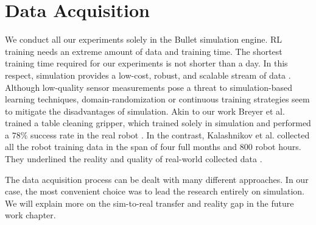 \section{Data Acquisition}

We conduct all our experiments solely in the Bullet simulation engine. RL training needs an extreme amount of data and training time. The shortest training time required for our experiments is not shorter than a day. In this respect, simulation provides a low-cost, robust, and scalable stream of data \cite{openai2019rubiks}. Although low-quality sensor measurements pose a threat to simulation-based learning techniques, domain-randomization or continuous training strategies seem to mitigate the disadvantages of simulation. Akin to our work Breyer et al. trained a table cleaning gripper, which trained solely in simulation and performed a \(78\%\) success rate in the real robot \cite{Breyer2018}. In the contrast, Kalashnikov et al. collected all the robot training data in the span of four full months and 800 robot hours. They underlined the reality and quality of real-world collected data \cite{Kalashnikov2018}. 

The data acquisition process can be dealt with many different approaches. In our case, the most convenient choice was to lead the research entirely on simulation. We will explain more on the sim-to-real transfer and reality gap in the future work chapter.

